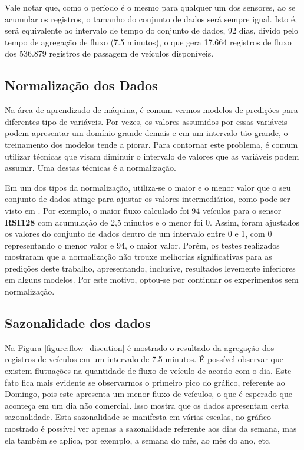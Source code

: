 Vale notar que, como o período é o mesmo para qualquer um dos sensores, ao se acumular os registros, o tamanho do conjunto de dados será sempre igual. Isto é, será equivalente ao intervalo de tempo do conjunto de dados, 92 dias, divido pelo tempo de agregação de fluxo (7.5 minutos), o que gera 17.664 registros de fluxo dos 536.879 registros de passagem de veículos disponíveis.

\subsection{Normalização dos Dados}

Na área de aprendizado de máquina, é comum vermos modelos de predições para diferentes tipo de variáveis. Por vezes, os valores assumidos por essas variáveis podem apresentar um domínio grande demais e em um intervalo tão grande, o treinamento dos modelos tende a piorar. Para contornar este problema, é comum utilizar técnicas que visam diminuir o intervalo de valores que as variáveis podem assumir. Uma destas técnicas é a normalização. 

Em um dos tipos da normalização, utiliza-se o maior e o menor valor que o seu conjunto de dados atinge para ajustar os valores intermediários, como pode ser visto em \cite{Dorian_1999}. Por exemplo, o maior fluxo calculado foi 94 veículos para o sensor \textbf{RSI128} com acumulação de 2,5 minutos e o menor foi 0. Assim, foram ajustados os valores do conjunto de dados dentro de um intervalo entre 0 e 1, com 0 representando o menor valor e 94, o maior valor. Porém, os testes realizados mostraram que a normalização não trouxe melhorias significativas para as predições deste trabalho, apresentando, inclusive, resultados levemente inferiores em alguns modelos. Por este motivo, optou-se por continuar os experimentos sem normalização.

\subsection{Sazonalidade dos dados}

Na Figura \ref{figure:flow_discution} é mostrado o resultado da agregação dos registros de veículos em um intervalo de 7.5 minutos. É possível observar que existem flutuações na quantidade de fluxo de veículo de acordo com o dia. Este fato fica mais evidente se observarmos o primeiro pico do gráfico, referente ao Domingo, pois este apresenta um menor fluxo de veículos, o que é esperado que aconteça em um dia não comercial. Isso mostra que os dados apresentam certa sazonalidade. Esta sazonalidade se manifesta em várias escalas, no gráfico mostrado é possível ver apenas a sazonalidade referente aos dias da semana, mas ela também se aplica, por exemplo, a semana do mês, ao mês do ano, etc. 

